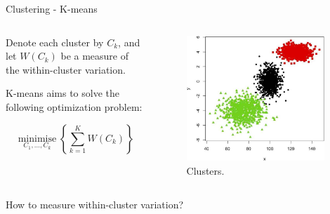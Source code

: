 \begin{frame}[allowframebreaks]{Clustering - K-means}
\begin{columns}
\begin{column}{0.45\textwidth}
    \vspace{1em}

    Denote each cluster by $C_k$, and let $W(C_k)$ be a measure of the within-cluster variation.

    \vspace{1em}

    K-means aims to solve the following optimization problem:

    \vspace{0.5em}

    \begin{equation}
        \operatorname*{minimise}_{C_1, \ldots, C_k} \left\{ \sum_{k=1}^{K} W(C_k) \right\}
    \end{equation}

    \end{column}
    \begin{column}{0.55\textwidth}
        \begin{figure}
            \centering
            \includegraphics[width=0.95\textwidth,keepaspectratio]{images/k-means-example-1.jpg}
            \caption{Clusters.}
        \end{figure}
    \end{column}
\end{columns}

\framebreak

\begin{block}{}
    How to measure within-cluster variation? 


\end{block}
\end{frame}
